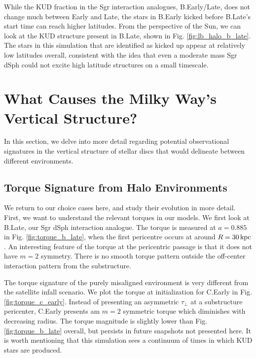 While the KUD fraction in the Sgr interaction analogues, B.Early/Late, does not change much between Early and Late, the stars in B.Early kicked before B.Late's start time can reach higher latitudes. From the perspective of the Sun, we can look at the KUD structure present in B.Late, shown in Fig. \ref{fig:lb_halo_b_late}. The stars in this simulation that are identified as kicked up appear at relatively low latitudes overall, consistent with the idea that even a moderate mass Sgr dSph could not excite high latitude structures on a small timescale.



\section{What Causes the Milky Way's Vertical Structure?} \label{sec:disentangle}

In this section, we delve into more detail regarding potential observational signatures in the vertical structure of stellar discs that would delineate between different environments. 



\subsection{Torque Signature from Halo Environments} \label{ssec:torque_signature}


We return to our choice cases here, and study their evolution in more detail. First, we want to understand the relevant torques in our models. We first look at B.Late, our Sgr dSph interaction analogue. The torque is measured at $a=0.885$ in Fig. \ref{fig:torque_b_late}, when the first pericentre occurs at around $R = 30 \,\text{kpc}$. An interesting feature of the torque at the pericentric passage is that it does not have $m=2$ symmetry. There is no smooth torque pattern outside the off-center interaction pattern from the substructure.

The torque signature of the purely misaligned environment is very different from the satellite infall scenario. We plot the torque at initialization for C.Early in Fig. \ref{fig:torque_c_early}. Instead of presenting an asymmetric $\tau_\perp$ at a substructure pericenter, C.Early presents am $m=2$ symmetric torque which diminishes with decreasing radius. The torque magnitude is slightly lower than Fig. \ref{fig:torque_b_late} overall, but persists in future snapshots not presented here. It is worth mentioning that this simulation sees a continuum of times in which KUD stars are produced.


